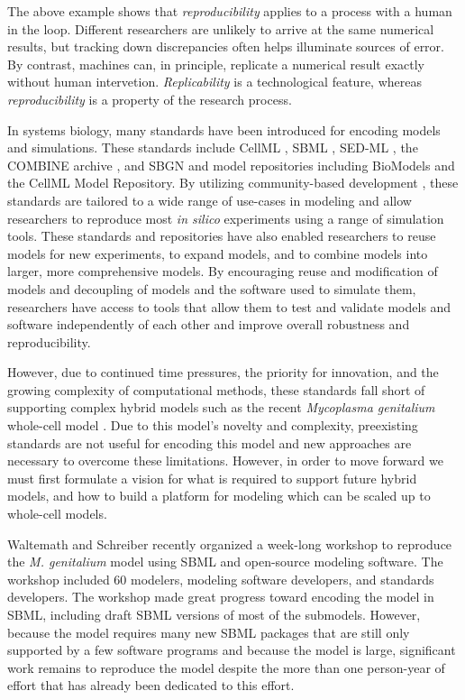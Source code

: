 \documentclass[journal,transmag,twoside]{IEEEtran}
\begin{document}
The above example shows that \textit{reproducibility} applies to a process with a human in the loop. Different researchers are unlikely to arrive at the same numerical results, but tracking down discrepancies often helps illuminate sources of error. By contrast, machines can, in principle, replicate a numerical result exactly without human intervetion. \textit{Replicability} is a technological feature, whereas \textit{reproducibility} is a property of the research process.

In systems biology, many standards have been introduced for encoding models and simulations. These standards include CellML \cite{cuellar2003overview}, SBML \cite{hucka2003}, SED-ML \cite{sedml2011}, the COMBINE archive \cite{COMBINE2012}, and SBGN \cite{LeNovereHMMSS09} and model repositories including BioModels and the CellML Model Repository.
By utilizing community-based development \cite{hucka2015promoting}, these standards are tailored to a wide range of use-cases in modeling and allow researchers to reproduce most \textit{in silico} experiments using a range of simulation tools. These standards and repositories have also enabled researchers to reuse models for new experiments, to expand models, and to combine models into larger, more comprehensive models. By encouraging reuse and modification of models and decoupling of models and the software used to simulate them, researchers have access to tools that allow them to test and validate models and software independently of each other and improve overall robustness and reproducibility.

However, due to continued time pressures, the priority for innovation, and the growing complexity of computational methods, these standards fall short of supporting complex hybrid models such as the recent \textit{Mycoplasma genitalium} whole-cell model \cite{Karr2012}. Due to this model's novelty and complexity, preexisting standards are not useful for encoding this model and new approaches are necessary to overcome these limitations. However, in order to move forward we must first formulate a vision for what is required to support future hybrid models, and how to build a platform for modeling which can be scaled up to whole-cell models.

Waltemath and Schreiber recently organized a week-long workshop to reproduce the \textit{M. genitalium} model using SBML and open-source modeling software. The workshop included 60 modelers, modeling software developers, and standards developers. The workshop made great progress toward encoding the model in SBML, including draft SBML versions of most of the submodels. However, because the model requires many new SBML packages that are still only supported by a few software programs and because the model is large, significant work remains to reproduce the model despite the more than one person-year of effort that has already been dedicated to this effort.
\end{document}
